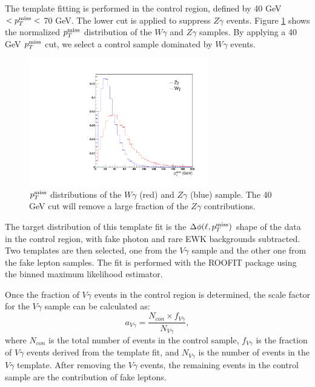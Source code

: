 \documentclass[thesis.tex]{subfiles}
\renewcommand\_{\textunderscore\allowbreak}
\begin{document}
The template fitting is performed in the control region, defined by 40 GeV $< p_T^\textrm{miss} <$ 70 GeV. The lower cut is applied to suppress $Z\gamma$ events. Figure \ref{fig:WGZG_met} shows the normalized $p_T^\textrm{miss}$ distribution of the $W\gamma$ and $Z\gamma$ samples. By applying a 40 GeV $p_T^\textrm{miss}$ cut, we select a control sample dominated by $W\gamma$ events.  

\begin{figure}[!hbt]
  \centering
    \includegraphics[width=0.7\textwidth]{Figures/dphiTemplate_MET.pdf}
  \caption{$p_T^\textrm{miss}$ distributions of the $W\gamma$ (red) and $Z\gamma$ (blue) sample. The 40 GeV cut will remove a large fraction of the $Z\gamma$ contributions.}
    \label{fig:WGZG_met}
\end{figure}

The target distribution of this template fit is the $\Delta\phi(\ell,p_T^\textrm{miss})$ shape of the data in the control region, with fake photon and rare EWK backgrounds subtracted. Two templates are then selected, one from the $V\gamma$ sample and the other one from the fake lepton samples. The fit is performed with the ROOFIT package using the binned maximum likelihood estimator.

Once the fraction of $V\gamma$ events in the control region is determined, the scale factor for the $V\gamma$ sample can be calculated as: 
\begin{equation}
 		a_{V\gamma} = \frac{N_{con}\times f_{V\gamma}}{N_{V\gamma}}, 
\end{equation}
where $N_{con}$ is the total number of events in the control sample, $f_{V\gamma}$ is the fraction of $V\gamma$ events derived from the template fit, and $N_{V\gamma}$ is the number of events in the $V\gamma$ template. After removing the $V\gamma$ events, the remaining events in the control sample are the contribution of fake leptons. 
\end{document}
